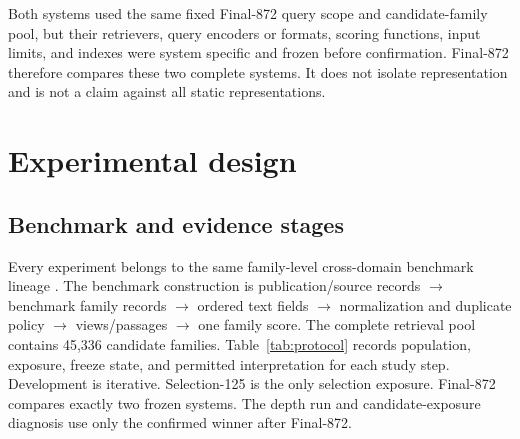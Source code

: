 \documentclass[final,5p,times,twocolumn]{elsarticle}
\begin{document}
Both systems used the same fixed Final-872 query
scope and candidate-family pool, but their retrievers, query encoders or
formats, scoring functions, input limits, and indexes were system specific and
frozen before confirmation. Final-872 therefore compares these two complete
systems. It does not isolate representation and is not a claim against all
static representations.

\section{Experimental design}

\subsection{Benchmark and evidence stages}

Every experiment belongs to the same family-level cross-domain benchmark
lineage \cite{dapfam2026}. The benchmark construction is publication/source
records \(\rightarrow\) benchmark family records \(\rightarrow\) ordered text
fields \(\rightarrow\) normalization and duplicate policy \(\rightarrow\)
views/passages \(\rightarrow\) one family score. The complete retrieval pool
contains 45,336 candidate families. Table~\ref{tab:protocol} records population, exposure,
freeze state, and permitted interpretation for each study step. Development
is iterative. Selection-125 is the only selection exposure. Final-872 compares
exactly two frozen systems. The depth run and candidate-exposure diagnosis use
only the confirmed winner after Final-872.
\end{document}

